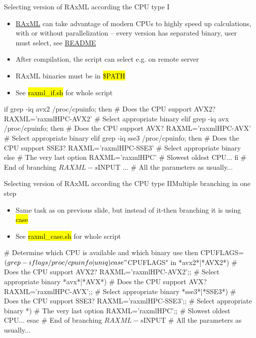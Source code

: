 \documentclass[compress, ucs, xelatex, 11pt, xcolor=svgnames,
  hyperref={
    bookmarks=true,
    unicode=true,
    colorlinks=true,
    pdftitle={Linux, command line and MetaCentrum},
    plainpages=false,
    pdfauthor={Vojtech Zeisek},
    pdfsubject={Course about use of Linux command line, writing shell scripts and using MetaCentrum of CESNET},
    pdfcreator={XeLaTeX},
    pdfkeywords={Linux, GNU, BASH, shell, command line, MetaCentrum},
    linkcolor=DarkRed,
    anchorcolor=DarkBlue,
    citecolor=Indigo,
    filecolor=NavyBlue,
    menucolor=DarkMagenta,
    urlcolor=DarkBlue,
    pdftex},
  url={hyphens, lowtilde} %
  ]{beamer}
\renewcommand{\texttt}[1]{\hl{\ttfamily #1}}
\begin{document}
\begin{frame}[fragile]{Selecting version of RAxML according the CPU type I}
  \begin{itemize}
    \item \href{https://github.com/stamatak/standard-RAxML}{RAxML} can take advantage of modern CPUs to highly speed up calculations, with or without parallelization -- every version has separated binary, user must select, see \href{https://github.com/stamatak/standard-RAxML/blob/master/README}{README}
    \item After compilation, the script can select e.g. on remote server
    \item RAxML binaries must be in \texttt{\$PATH}
    \item See \texttt{raxml\_if.sh} for whole script
  \end{itemize}
  \begin{bashcode}
    if grep -iq avx2 /proc/cpuinfo; then # Does the CPU support AVX2?
      RAXML='raxmlHPC-AVX2' # Select appropriate binary
      elif grep -iq avx /proc/cpuinfo; then # Does the CPU support AVX?
        RAXML='raxmlHPC-AVX' # Select appropriate binary
        elif grep -iq sse3 /proc/cpuinfo; then # Does the CPU support SSE3?
          RAXML='raxmlHPC-SSE3' # Select appropriate binary
          else # The very last option
            RAXML='raxmlHPC' # Slowest oldest CPU...
      fi # End of branching
    $RAXML -s $INPUT ... # All the parameters as usually...
  \end{bashcode}
\end{frame}

\begin{frame}[fragile]{Selecting version of RAxML according the CPU type II}{Multiple branching in one step}
  \begin{itemize}
    \item Same task as on previous slide, but instead of it-then branching it is using \texttt{case}
    \item See \texttt{raxml\_case.sh} for whole script
  \end{itemize}
  \begin{bashcode}
    # Determine which CPU is available and which binary use then
    CPUFLAGS=$(grep -i flags /proc/cpuinfo | uniq)
    case "$CPUFLAGS" in
      *avx2*|*AVX2*) # Does the CPU support AVX2?
        RAXML='raxmlHPC-AVX2';; # Select appropriate binary
      *avx*|*AVX*) # Does the CPU support AVX?
        RAXML='raxmlHPC-AVX';; # Select appropriate binary
      *sse3*|*SSE3*) # Does the CPU support SSE3?
        RAXML='raxmlHPC-SSE3';; # Select appropriate binary
      *) # The very last option
        RAXML='raxmlHPC';; # Slowest oldest CPU...
      esac # End of branching
    $RAXML -s $INPUT # All the parameters as usually...
  \end{bashcode}
\end{frame}
\end{document}
